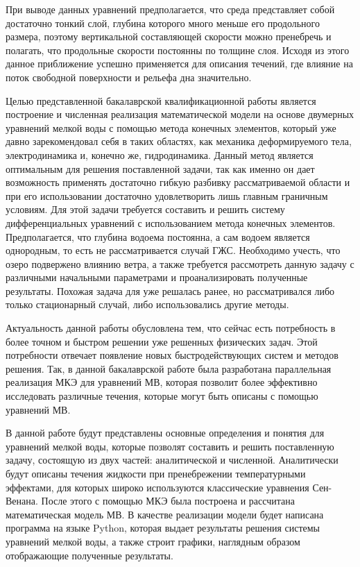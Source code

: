 \documentclass[14pt]{extreport}
\begin{document}
При выводе данных уравнений предполагается, что среда представляет собой достаточно тонкий слой, глубина которого много меньше его продольного размера, поэтому вертикальной составляющей скорости можно пренебречь и полагать, что продольные скорости постоянны по толщине слоя.  Исходя из этого данное приближение успешно применяется для описания течений, где влияние на поток свободной поверхности и рельефа дна значительно.

Целью представленной бакалаврской квалификационной работы является построение и численная реализация математической модели на основе двумерных уравнений мелкой воды с помощью метода конечных элементов, который уже давно зарекомендовал\cite{bib:fem:nory} себя в таких областях, как механика деформируемого тела, электродинамика и, конечно же, гидродинамика. Данный метод является оптимальным для решения поставленной задачи, так как именно он дает возможность применять достаточно гибкую разбивку рассматриваемой области и при его использовании достаточно удовлетворить лишь главным граничным условиям. Для этой задачи требуется составить и решить систему дифференциальных уравнений с использованием метода конечных элементов. Предполагается, что глубина водоема постоянна, а сам водоем является однородным, то есть не рассматривается случай ГЖС. Необходимо учесть, что озеро подвержено влиянию ветра, а также требуется рассмотреть данную задачу с различными начальными параметрами и проанализировать полученные результаты. Похожая задача для уже решалась ранее, но рассматривался либо только стационарный случай\cite{bib:pankratov:2014:RTMV}, либо использовались другие методы\cite{bib:pankratov:2016:ANYMV}.

Актуальность данной работы обусловлена тем, что сейчас есть потребность в более точном и быстром решении уже решенных физических задач. Этой потребности отвечает появление новых быстродействующих систем и методов решения. Так, в данной бакалаврской работе была разработана параллельная реализация МКЭ для уравнений МВ, которая позволит более эффективно исследовать различные течения, которые могут быть описаны с помощью уравнений МВ.

В данной работе будут представлены основные определения и понятия для уравнений мелкой воды, которые позволят составить и решить поставленную задачу, состоящую из двух частей: аналитической и численной. Аналитически будут описаны течения жидкости при пренебрежении температурными эффектами, для которых широко используются классические уравнения Сен-Венана. После этого с помощью МКЭ была построена и рассчитана математическая модель МВ. В качестве реализации модели будет написана программа на языке Python\cite{bib:python:lutz:2013,bib:python:nm:2013}, которая выдает результаты решения системы уравнений мелкой воды, а также строит графики, наглядным образом отображающие полученные результаты.
\end{document}
